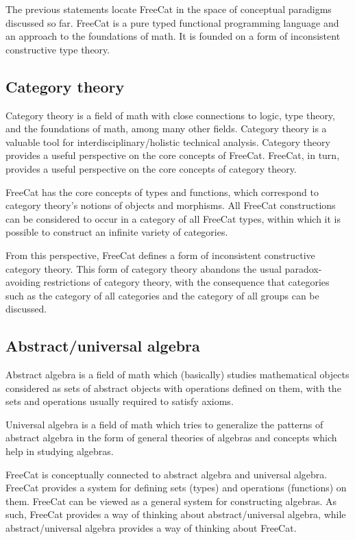 \documentclass{article}
\begin{document}
The previous statements locate FreeCat in the space of conceptual paradigms discussed so far. FreeCat is a pure typed functional programming language and an approach to the foundations of math. It is founded on a form of inconsistent constructive type theory.

\subsection{Category theory}

Category theory is a field of math with close connections to logic, type theory, and the foundations of math, among many other fields. Category theory is a valuable tool for interdisciplinary/holistic technical analysis. Category theory provides a useful perspective on the core concepts of FreeCat. FreeCat, in turn, provides a useful perspective on the core concepts of category theory.

FreeCat has the core concepts of types and functions, which correspond to category theory's notions of objects and morphisms. All FreeCat constructions can be considered to occur in a category of all FreeCat types, within which it is possible to construct an infinite variety of categories.

From this perspective, FreeCat defines a form of inconsistent constructive category theory. This form of category theory abandons the usual paradox-avoiding restrictions of category theory, with the consequence that categories such as the category of all categories and the category of all groups can be discussed.

\subsection{Abstract/universal algebra}

Abstract algebra is a field of math which (basically) studies mathematical objects considered as sets of abstract objects with operations defined on them, with the sets and operations usually required to satisfy axioms.

Universal algebra is a field of math which tries to generalize the patterns of abstract algebra in the form of general theories of algebras and concepts which help in studying algebras.

FreeCat is conceptually connected to abstract algebra and universal algebra. FreeCat provides a system for defining sets (types) and operations (functions) on them. FreeCat can be viewed as a general system for constructing algebras. As such, FreeCat provides a way of thinking about abstract/universal algebra, while abstract/universal algebra provides a way of thinking about FreeCat.
\end{document}

